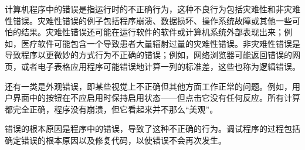 计算机程序中的错误是指运行时的不正确行为，这种不良行为包括灾难性和非灾难性错误。灾难性错误的例子包括程序崩溃、数据损坏、操作系统故障或其他一些可怕的结果。灾难性错误还可能在运行软件的软件或计算机系统外部表现出来；例如，医疗软件可能包含一个导致患者大量辐射过量的灾难性错误。非灾难性错误是导致程序以更微妙的方式行为不正确的错误；例如，网络浏览器可能返回错误的网页，或者电子表格应用程序可能错误地计算一列的标准差，这些也称为逻辑错误。

还有一类是外观错误，即某些视觉上不正确但其他方面工作正常的问题。例如，用户界面中的按钮在不应启用时保持启用状态——但点击它没有任何反应。所有计算都完全正确，程序没有崩溃，但它看起来并不那么“美观”。

错误的根本原因是程序中的错误，导致了这种不正确的行为。调试程序的过程包括确定错误的根本原因以及修复代码，以使错误不会再次发生。












